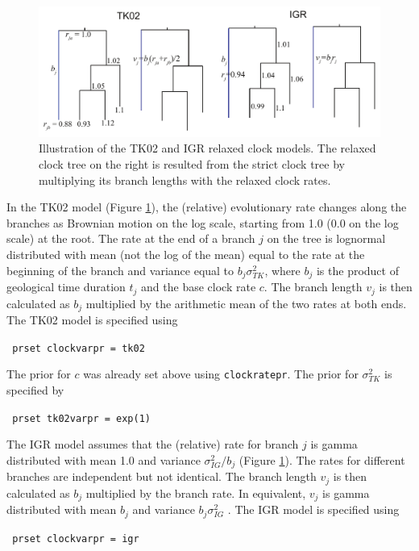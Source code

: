 \documentclass[12pt]{article}
\begin{document}
\begin{figure}[h]
\includegraphics[width=1.0\textwidth]{figures/relaxcl.pdf}
\caption{Illustration of the TK02 and IGR relaxed clock models.
The relaxed clock tree on the right is resulted from the strict clock tree by multiplying its branch lengths with the relaxed clock rates.
}
\label{fig_relaxcl}
\end{figure}

In the TK02 model (Figure \ref{fig_relaxcl}), the (relative) evolutionary rate changes along the branches as Brownian motion on the log scale, starting from 1.0 (0.0 on the log scale) at the root.
The rate at the end of a branch $j$ on the tree is lognormal distributed with mean  (not the log of the mean) equal to the rate at the beginning of the branch
and variance equal to $b_j \sigma^2_{TK}$, where $b_j$ is the product of geological time duration $t_j$ and the base clock rate $c$.
The branch length $v_j$ is then calculated as $b_j$ multiplied by the arithmetic mean of the two rates at both ends.
The TK02 model is specified using

\medskip
{\tt \color{red} \noindent
prset clockvarpr = tk02
}
\medskip

\noindent The prior for $c$ was already set above using {\tt clockratepr}. The prior for $\sigma^2_{TK}$ is specified by 

\medskip
{\tt \color{red} \noindent
prset tk02varpr = exp(1)
}
\medskip

The IGR model assumes that the (relative) rate for branch $j$ is gamma distributed with mean 1.0 and variance $\sigma^2_{IG}/b_j$ (Figure \ref{fig_relaxcl}).
The rates for different branches are independent but not identical.
The branch length $v_j$ is then calculated as $b_j$ multiplied by the branch rate.
In equivalent, $v_j$ is gamma distributed with mean $b_j$ and variance $b_j \sigma^2_{IG}$ \citep[original definition in][]{Lepage:2007bq}. 
The IGR model is specified using

\medskip
{\tt \color{red} \noindent
prset clockvarpr = igr
}
\medskip
\end{document}
